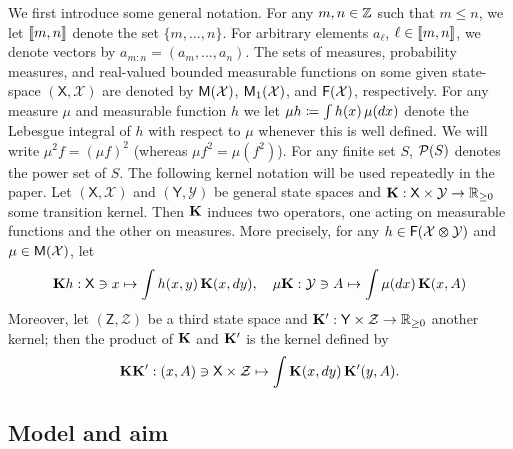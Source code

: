 We first introduce some general notation. 
For any $m, n \in \mathbb{Z}$ such that $m \leq n$, we let $\llbracket m, n \rrbracket$ denote the set $\{m, \ldots, n\}$. For arbitrary elements $a_\ell$, $\ell \in \llbracket m, n \rrbracket$, we denote vectors by $a_{m:n} = (a_m, \ldots, a_n)$. The sets of measures, probability measures, and real-valued bounded measurable functions on some given state-space $(\mathsf{X}, \mathcal{X})$ are denoted by $\mathsf{M}(\mathcal{X})$, $\mathsf{M}_1(\mathcal{X})$, and $\mathsf{F}(\mathcal{X})$, respectively. For any measure $\mu$ and measurable function $h$ we let $\mu h \coloneqq \int h(x) \, \mu(d x)$ denote the Lebesgue integral of $h$ with respect to $\mu$ whenever this is well defined. We will write $\mu^2 f = (\mu f)^2$ (whereas $\mu f^2 = \mu(f^2)$). For any finite set $S$, $\mathcal{P}(S)$ denotes the power set of $S$. The following kernel notation will be used repeatedly in the paper. Let $(\mathsf{X}, \mathcal{X})$ and $(\mathsf{Y}, \mathcal{Y})$ be general state spaces and $\mathbf{K} : \mathsf{X} \times \mathcal{Y} \to \mathbb{R}_{\geq 0}$ some transition kernel. Then $\mathbf{K}$ induces two operators, one acting on measurable functions and the other on measures. More precisely, for any $h \in \mathsf{F}(\mathcal{X} \varotimes \mathcal{Y})$ and $\mu \in \mathsf{M}(\mathcal{X})$, let 
$$
\mathbf{K} h : \mathsf{X} \ni x \mapsto \int h(x, y) \, \mathbf{K}(x, d y), \quad \mu \mathbf{K} : \mathcal{Y} \ni A \mapsto \int \mu(d x) \, \mathbf{K}(x, A)
$$ 
Moreover, let $(\mathsf{Z}, \mathcal{Z})$ be a third state space and $\mathbf{K}' : \mathsf{Y} \times \mathcal{Z} \to \mathbb{R}_{\geq 0}$ another kernel; then the product of $\mathbf{K}$ and $\mathbf{K}'$ is the kernel defined by 
$$
\mathbf{K} \mathbf{K}' : (x, A) \ni \mathsf{X} \times \mathcal{Z} \mapsto \int \mathbf{K}(x, d y) \, \mathbf{K}'(y, A). 
$$    

\subsection{Model and aim}
\label{sec:model}

